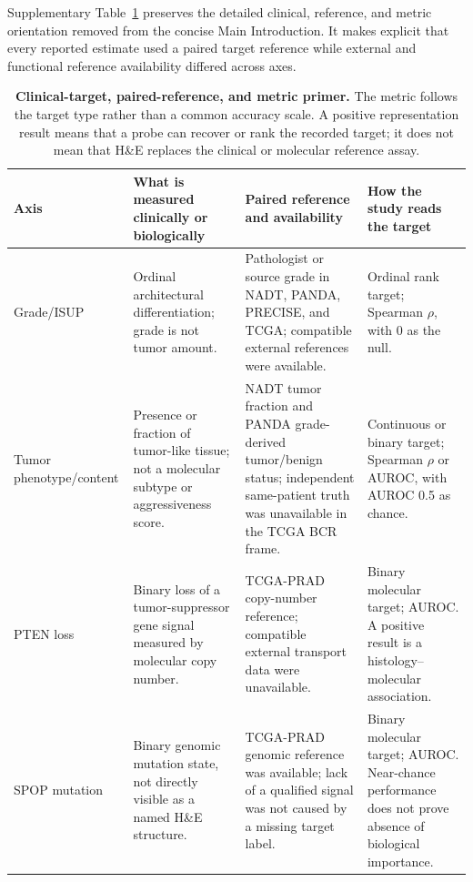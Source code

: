 Supplementary Table~\ref{tab:supp-clinical-reference-primer} preserves the detailed clinical, reference,
and metric orientation removed from the concise Main Introduction. It makes explicit that
every reported estimate used a paired target reference while external and functional
reference availability differed across axes.

\begin{table}[H]
\centering
\footnotesize
\setlength{\tabcolsep}{3pt}
\renewcommand{\arraystretch}{1.15}
\caption{\textbf{Clinical-target, paired-reference, and metric primer.} The metric follows
the target type rather than a common accuracy scale. A positive representation result means
that a probe can recover or rank the recorded target; it does not mean that H\&E replaces
the clinical or molecular reference assay.}
\label{tab:supp-clinical-reference-primer}
\begin{tabular}{@{}>{\raggedright\arraybackslash}p{}
>{\raggedright\arraybackslash}p{}
>{\raggedright\arraybackslash}p{}
>{\raggedright\arraybackslash}p{}@{}}
\toprule
Axis & What is measured clinically or biologically & Paired reference and availability & How the study reads the target \\
\midrule
Grade/ISUP & Ordinal architectural differentiation; grade is not tumor amount. & Pathologist
or source grade in NADT, PANDA, PRECISE, and TCGA; compatible external references were
available. & Ordinal rank target; Spearman $\rho$, with 0 as the null. \\
Tumor phenotype/\allowbreak content & Presence or fraction of tumor-like tissue; not a
molecular subtype or aggressiveness score. & NADT tumor fraction and PANDA grade-derived
tumor/benign status; independent same-patient truth was unavailable in the TCGA BCR frame. &
Continuous or binary target; Spearman $\rho$ or AUROC, with AUROC 0.5 as chance. \\
PTEN loss & Binary loss of a tumor-suppressor gene signal measured by molecular copy number.
& TCGA-PRAD copy-number reference; compatible external transport data were unavailable. &
Binary molecular target; AUROC. A positive result is a histology--molecular association. \\
SPOP mutation & Binary genomic mutation state, not directly visible as a named H\&E
structure. & TCGA-PRAD genomic reference was available; lack of a qualified signal was not
caused by a missing target label. & Binary molecular target; AUROC. Near-chance performance
does not prove absence of biological importance. \\

\end{tabular}
\end{table}
